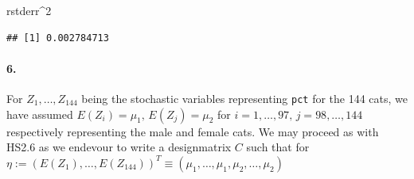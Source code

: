 \documentclass[
]{article}
\newenvironment{Shaded}{\begin{snugshade}}{\end{snugshade}}
\newcommand{\DecValTok}[1]{\textcolor[rgb]{0.00,0.00,0.81}{#1}}
\newcommand{\NormalTok}[1]{#1}
\newcommand{\OperatorTok}[1]{\textcolor[rgb]{0.81,0.36,0.00}{\textbf{#1}}}
\begin{document}
\begin{Shaded}
\begin{Highlighting}[]
\NormalTok{rstderr}\OperatorTok{^}\DecValTok{2}
\end{Highlighting}
\end{Shaded}

\begin{verbatim}
## [1] 0.002784713
\end{verbatim}

\hypertarget{section-14}{%
\paragraph{\texorpdfstring{\textbf{6.}}{6.}}\label{section-14}}

For \(Z_1,\ldots,Z_{144}\) being the stochastic variables representing
\texttt{pct} for the 144 cats, we have assumed
\(E(Z_i)=\mu_1,\,E(Z_j)=\mu_2\) for \(i=1,\ldots,97,\,j=98,\ldots,144\)
respectively representing the male and female cats. We may proceed as
with HS2.6 as we endevour to write a designmatrix \(C\) such that for
\(\eta:=\left({E(Z_1),\ldots,E(Z_{144})}\right)^T\equiv\left({\mu_1,\ldots,\mu_1,\mu_2,\ldots,\mu_2}\right)\)
\end{document}
